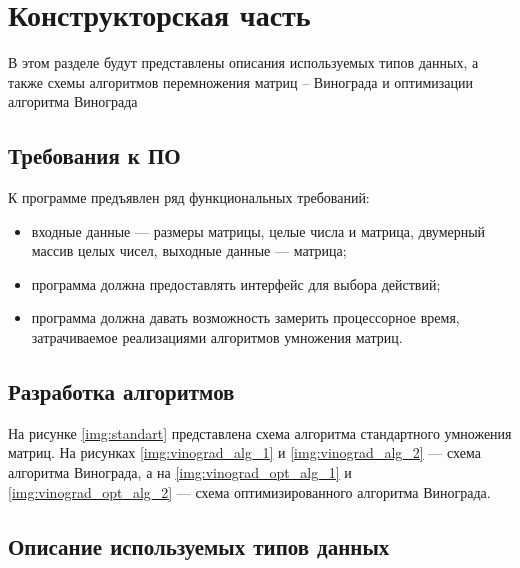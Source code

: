 \chapter{Конструкторская часть}

В этом разделе будут представлены описания используемых типов данных, а также схемы алгоритмов перемножения матриц – Винограда и оптимизации алгоритма Винограда

\section{Требования к ПО}
К программе предъявлен ряд функциональных требований:
\begin{itemize}
	\item входные данные --- размеры матрицы, целые числа и матрица, двумерный массив целых чисел, выходные данные --- матрица;
	\item программа должна предоставлять интерфейс для выбора действий;
	\item программа должна давать возможность замерить процессорное время, затрачиваемое реализациями алгоритмов умножения матриц.
\end{itemize}

\section{Разработка алгоритмов}

На рисунке \ref{img:standart} представлена схема алгоритма стандартного умножения матриц.
На рисунках \ref{img:vinograd_alg_1} и \ref{img:vinograd_alg_2} --- схема алгоритма Винограда, а на \ref{img:vinograd_opt_alg_1} и \ref{img:vinograd_opt_alg_2} --- схема оптимизированного алгоритма Винограда.



\clearpage
{}
\clearpage
{}
\clearpage
{}
\clearpage
{}
\clearpage
{}
\clearpage

\section{Описание используемых типов данных}

